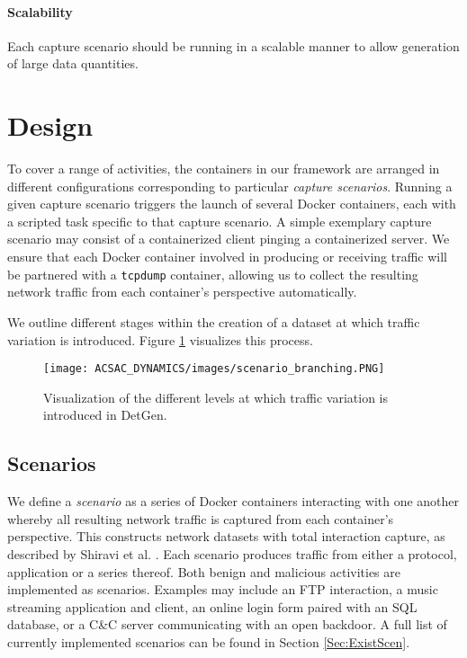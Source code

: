 \documentclass[sigconf]{acmart}
\begin{document}
\paragraph{Scalability} Each capture scenario should be running in a scalable manner to allow generation of large data quantities.



\section{Design}\label{Sec:Design}

To cover a range of activities, the containers in our framework are arranged in different configurations corresponding to particular \emph{capture scenarios}. Running a given capture scenario triggers the launch of several Docker containers, each with a scripted task specific to that capture scenario. A simple exemplary capture scenario may consist of a containerized client pinging a containerized server. We ensure that each Docker container involved in producing or receiving traffic will be partnered with a \texttt{tcpdump} container, allowing us to collect the resulting network traffic from each container's perspective automatically. 

We outline different stages within the creation of a dataset at which traffic variation is introduced. Figure \ref{Fig:branching} visualizes this process.


\begin{figure}
 \centering 
 \texttt{[image: ACSAC\_DYNAMICS/images/scenario\_branching.PNG]}
 \caption{Visualization of the different levels at which traffic variation is introduced in DetGen.}
 \label{Fig:branching}
\end{figure}


\subsection{Scenarios}
\label{Sec:Scenarios}

We define a \emph{scenario} as a series of Docker containers interacting with one another whereby all resulting network traffic is captured from each container's perspective. This constructs network datasets with total interaction capture, as described by Shiravi et al. \cite{shiravi2012toward}. Each scenario produces traffic from either a protocol, application or a series thereof. Both benign and malicious activities are implemented as scenarios. Examples may include an FTP interaction, a music streaming application and client, an online login form paired with an SQL database, or a C\&C server communicating with an open backdoor. A full list of currently implemented scenarios can be found in Section \ref{Sec:ExistScen}.
\end{document}
